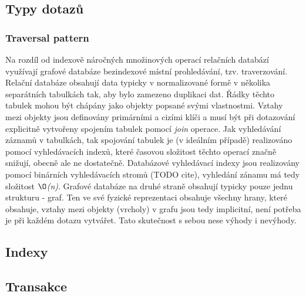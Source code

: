 


\subsection{Typy dotazů}

\subsubsection{Traversal pattern}

Na rozdíl od indexově náročných množinových operací relačních databází využívají grafové databáze bezindexové místní prohledávání, tzv. traverzování.\cite{Anglels08} Relační databáze obsahují data typicky v normalizované formě v několika separátních tabulkách tak, aby bylo zamezeno duplikaci dat. Řádky těchto tabulek mohou být chápány jako objekty popsané svými vlastnostmi. Vztahy mezi objekty jsou definovány primárními a cizími klíči a musí být při dotazování explicitně vytvořeny spojením tabulek pomocí \textit{join} operace. Jak vyhledávání záznamů v tabulkách, tak spojování tabulek je (v ideálním případě) realizováno pomocí vyhledávacích indexů, které časovou složitost těchto operací značně snižují, obecně ale ne dostatečně. Databázové vyhledávací indexy jsou realizovány pomocí binárních vyhledávacích stromů (TODO cite), vyhledání zánamu má tedy složitost \textit{$\O$(n)}. 
Grafové databáze na druhé straně obsahují typicky pouze jednu strukturu - graf. Ten ve své fyzické reprezentaci obsahuje všechny hrany, které obsahuje, vztahy mezi objekty (vrcholy) v grafu jsou tedy implicitní, není potřeba je při každém dotazu vytvářet. Tato skutečnost s sebou nese výhody i nevýhody. 






\subsection{Indexy}

\subsection{Transakce}

